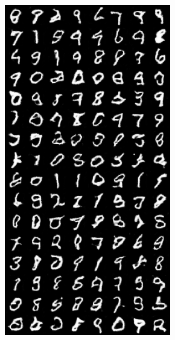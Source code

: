 \begin{figure}[H]
    \begin{subfigure}{0.2\textwidth}
        \centering
        \includegraphics[width=0.95\linewidth]{init/fake_sample_epoch_0005.png}
        \caption{}
        \label{subfig:init/fake_sample_epoch_0005}
    \end{subfigure}%
    \begin{subfigure}{0.2\textwidth}

\end{subfigure}
\end{figure}
